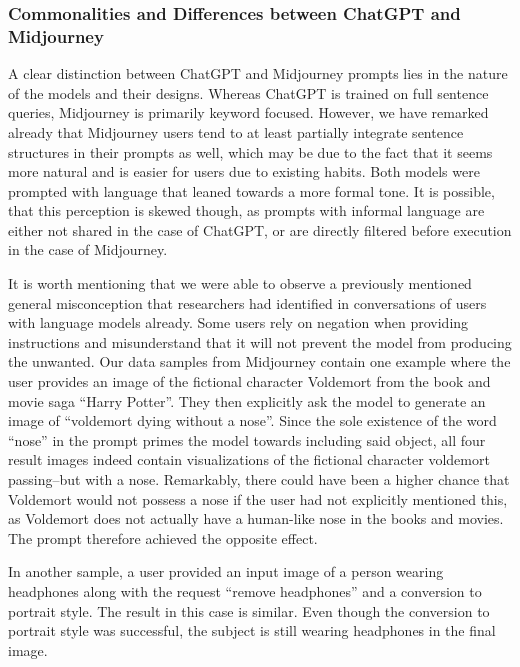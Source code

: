 \subsubsection{Commonalities and Differences between ChatGPT and Midjourney}
A clear distinction between ChatGPT and Midjourney prompts lies in the nature of the models and
their designs.
Whereas ChatGPT is trained on full sentence queries, Midjourney is primarily keyword focused.
However, we have remarked already that Midjourney users tend to at least partially integrate
sentence structures in their prompts as well, which may be due to the fact that it seems more
natural and is easier for users due to existing habits.
Both models were prompted with language that leaned towards a more formal tone.
It is possible, that this perception is skewed though, as prompts with informal language are
either not shared in the case of ChatGPT, or are directly filtered before execution in the case
of Midjourney.

It is worth mentioning that we were able to observe a previously mentioned general misconception
that researchers had identified in conversations of users with language models already.
Some users rely on negation when providing instructions and misunderstand that it will not
prevent the model from producing the unwanted.
Our data samples from Midjourney contain one example where the user provides an image of the
fictional character Voldemort from the book and movie saga ``Harry Potter''.
They then explicitly ask the model to
generate an image of ``voldemort dying without a nose''.
Since the sole existence of the word ``nose'' in the prompt primes the model towards including said
object, all four result images indeed contain visualizations of the fictional character voldemort
passing--but with a nose.
Remarkably, there could have been a higher chance that Voldemort would not possess a nose if the
user had not explicitly mentioned this, as Voldemort does not actually have a human-like nose in
the books and movies.
The prompt therefore achieved the opposite effect.

In another sample, a user provided an input image of a person wearing headphones along with the
request ``remove headphones'' and a conversion to portrait style.
The result in this case is similar.
Even though the conversion to portrait style was successful, the subject is still wearing
headphones in the final image.

